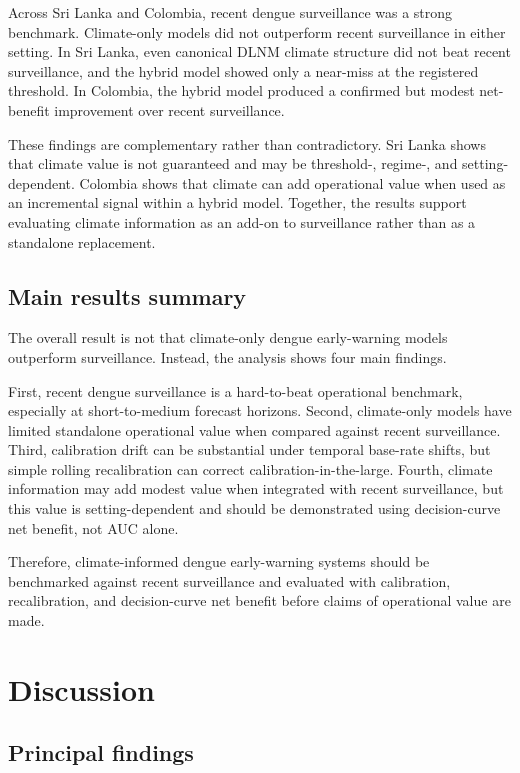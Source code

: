\documentclass[11pt,a4paper]{article}
\begin{document}
Across Sri Lanka and Colombia, recent dengue surveillance was a strong benchmark. Climate-only models did not outperform recent surveillance in either setting. In Sri Lanka, even canonical DLNM climate structure did not beat recent surveillance, and the hybrid model showed only a near-miss at the registered threshold. In Colombia, the hybrid model produced a confirmed but modest net-benefit improvement over recent surveillance.

These findings are complementary rather than contradictory. Sri Lanka shows that climate value is not guaranteed and may be threshold-, regime-, and setting-dependent. Colombia shows that climate can add operational value when used as an incremental signal within a hybrid model. Together, the results support evaluating climate information as an add-on to surveillance rather than as a standalone replacement.



\subsection{Main results summary}
\label{subsec:main-results-summary}

The overall result is not that climate-only dengue early-warning models outperform surveillance. Instead, the analysis shows four main findings.

First, recent dengue surveillance is a hard-to-beat operational benchmark, especially at short-to-medium forecast horizons. Second, climate-only models have limited standalone operational value when compared against recent surveillance. Third, calibration drift can be substantial under temporal base-rate shifts, but simple rolling recalibration can correct calibration-in-the-large. Fourth, climate information may add modest value when integrated with recent surveillance, but this value is setting-dependent and should be demonstrated using decision-curve net benefit, not AUC alone.

Therefore, climate-informed dengue early-warning systems should be benchmarked against recent surveillance and evaluated with calibration, recalibration, and decision-curve net benefit before claims of operational value are made.


\section{Discussion}
\label{sec:discussion}

\subsection{Principal findings}
\label{subsec:principal-findings}
\end{document}
